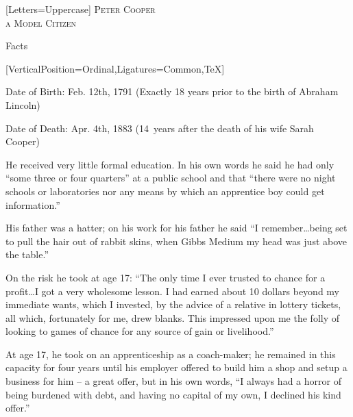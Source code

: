 \documentclass{article}
\begin{document}
\centering
{}[Letters=Uppercase]
\fontsize{0.8in}{0.6in}\selectfont
\scshape 
{} Peter Cooper \\
 a Model Citizen

\vspace{0.05in}

\fontsize{16pt}{16pt}\selectfont
{}
\justify
Facts %

\vspace{0.1in}

\begin{minipage}[t]{0.46\linewidth}
[VerticalPosition=Ordinal,Ligatures={Common,TeX}]
\fontsize{10.7pt}{12.7pt}\selectfont
\raggedright
\upshape
\begin{enumList}

\item Date of Birth: Feb. 12th, 1791 (Exactly 18 years prior to the birth of
{ Abraham Lincoln})

\item Date of Death: Apr. 4th, 1883 (14~years after the death of his wife
{ Sarah Cooper})

\item He received { very little formal education}. In his
own words he said he had
only ``some three or four quarters'' at a public school and that ``there were no
night schools or laboratories nor any means by which an apprentice boy could get
information.''

\item His father was a hatter; on his work for his father he said ``I
remember\ldots being set to pull the hair out of rabbit skins, when {\fontspec
{Gibbs Medium} my head was just above the table}.''

\item On the risk he took at age 17: ``The only time I ever trusted to chance
for a profit\ldots I got a very wholesome lesson. I had earned about 10 dollars
beyond my immediate wants, which I invested, by the advice of a relative in
lottery tickets, all which, fortunately for me, drew blanks. This impressed
upon me the { folly of looking to games of chance} for any
source of gain or livelihood.''

\item At age 17, he took on an apprenticeship as a coach-maker; he remained in
this capacity for four years until his employer offered to build him a shop and
setup a business for him -- a great offer, but in his own words, ``I always had a
{ horror of being burdened with debt}, and having no
capital of my own, { I declined his kind offer}.''


\end{enumList}
\end{minipage}
\end{document}
